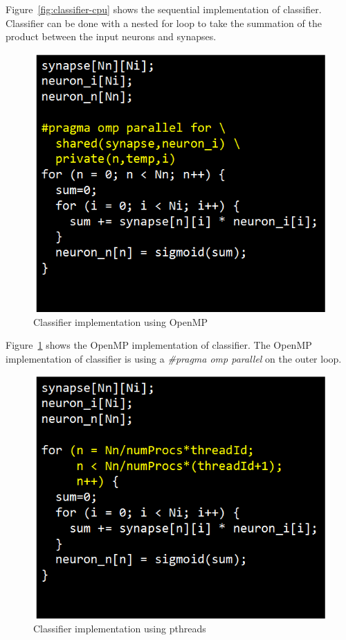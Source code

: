 Figure~\ref{fig:classifier-cpu} shows the sequential implementation of 
classifier. Classifier can be done with a nested for loop to take the 
summation of the product between the input neurons and synapses.


\begin{figure}[h]
  \begin{center}
    \includegraphics[width=0.5\linewidth]{cs758-figs/classifier-omp.png}
  \end{center}
\vspace{-0.2in}
  \caption{Classifier implementation using OpenMP}
  \label{fig:classifier-omp}
\vspace{-0.05in}
\end{figure}

Figure~\ref{fig:classifier-omp} shows the OpenMP implementation of 
classifier. The OpenMP implementation of classifier is using a 
\emph{\#pragma omp parallel} on the outer loop. 


\begin{figure}[h]
  \begin{center}
    \includegraphics[width=0.5\linewidth]{cs758-figs/classifier-pthread.png}
  \end{center}
\vspace{-0.2in}
  \caption{Classifier implementation using pthreads}
  \label{fig:classifier-pthread}
\vspace{-0.05in}
\end{figure}

